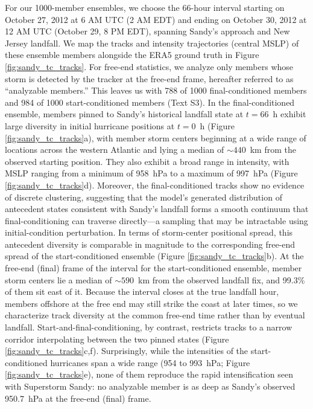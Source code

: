 \documentclass[final]{agujournal2019}
\begin{document}
For our 1000-member ensembles, we choose the 66-hour interval starting on October 27, 2012 at 6 AM UTC (2 AM EDT) and ending on October 30, 2012 at 12 AM UTC (October 29, 8 PM EDT), spanning Sandy's approach and New Jersey landfall. We map the tracks and intensity trajectories (central MSLP) of these ensemble members alongside the ERA5 ground truth in Figure \ref{fig:sandy_tc_tracks}. For free-end statistics, we analyze only members whose storm is detected by the tracker at the free-end frame, hereafter referred to as ``analyzable members.'' This leaves us with 788 of 1000 final-conditioned members and 984 of 1000 start-conditioned members (Text S3). In the final-conditioned ensemble, members pinned to Sandy's historical landfall state at $t=66$~h exhibit large diversity in initial hurricane positions at $t=0$~h (Figure \ref{fig:sandy_tc_tracks}a), with member storm centers beginning at a wide range of locations across the western Atlantic and lying a median of ${\sim}440$~km from the observed starting position. They also exhibit a broad range in intensity, with MSLP ranging from a minimum of 958~hPa to a maximum of 997~hPa (Figure \ref{fig:sandy_tc_tracks}d). Moreover, the final-conditioned tracks show no evidence of discrete clustering, suggesting that the model's generated distribution of antecedent states consistent with Sandy's landfall forms a smooth continuum that final-conditioning can traverse directly---a sampling that may be intractable using initial-condition perturbation. In terms of storm-center positional spread, this antecedent diversity is comparable in magnitude to the corresponding free-end spread of the start-conditioned ensemble (Figure \ref{fig:sandy_tc_tracks}b). At the free-end (final) frame of the interval for the start-conditioned ensemble, member storm centers lie a median of ${\sim}590$~km from the observed landfall fix, and 99.3\% of them sit east of it. Because the interval closes at the true landfall hour, members offshore at the free end may still strike the coast at later times, so we characterize track diversity at the common free-end time rather than by eventual landfall. Start-and-final-conditioning, by contrast, restricts tracks to a narrow corridor interpolating between the two pinned states (Figure \ref{fig:sandy_tc_tracks}c,f). Surprisingly, while the intensities of the start-conditioned hurricanes span a wide range (954 to 993~hPa; Figure \ref{fig:sandy_tc_tracks}e), none of them reproduce the rapid intensification seen with Superstorm Sandy: no analyzable member is as deep as Sandy's observed 950.7~hPa at the free-end (final) frame.
\end{document}
